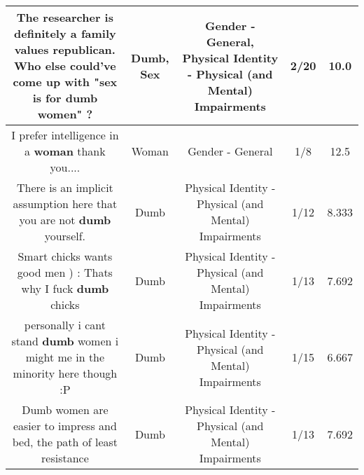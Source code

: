 \documentclass[11pt]{article}
\newlength\mylength
\begin{document}
\begin{center}
\begin{longtable}{|C{.65\mylength}|C{.30\mylength}|C{.12\mylength}|C{.12\mylength}|C{.12\mylength}|}
  \small The researcher is definitely a family values republican. Who else could've come up with "\textbf{sex} is for \textbf{dumb} women" ?\normalsize   & Dumb, Sex & Gender - General, Physical Identity - Physical (and Mental) Impairments & 2/20 & 10.0 \\  \hline
  \small I prefer intelligence in a \textbf{woman} thank you....\normalsize   & Woman & Gender - General & 1/8 & 12.5 \\  \hline
  \small There is an implicit assumption here that you are not \textbf{dumb} yourself.\normalsize   & Dumb & Physical Identity - Physical (and Mental) Impairments & 1/12 & 8.333 \\  \hline
  \small Smart chicks wants good men ) :
Thats why I fuck \textbf{dumb} chicks\normalsize   & Dumb & Physical Identity - Physical (and Mental) Impairments & 1/13 & 7.692 \\  \hline
  \small personally i cant stand \textbf{dumb} women i might me in the minority here though :P\normalsize   & Dumb & Physical Identity - Physical (and Mental) Impairments & 1/15 & 6.667 \\  \hline
  \small Dumb women are easier to impress and bed, the path of least resistance\normalsize   & Dumb & Physical Identity - Physical (and Mental) Impairments & 1/13 & 7.692 \\  \hline
  
\end{longtable}
\end{center}
\end{document}
